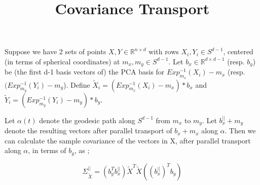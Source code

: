 \documentclass[]{article}
\title{Covariance Transport}
\begin{document}

%

Suppose we have 2 sets of points $X,Y \in \mathbb{R}^{n \times d}$ with rows $X_i, Y_i \in S^{d-1}$, centered (in terms of spherical coordinates) at $m_x, m_y \in S^{d-1}$. Let $b_x \in \mathbb{R}^{d \times d-1}$ (resp. $b_y$) be (the first d-1 basis vectors of) the PCA basis for $Exp_{m_x}^{-1}(X_i)-m_x$ (resp. $(Exp_{m_y}^{-1}(Y_i)-m_y$). Define $\tilde{X}_i = (Exp_{m_x}^{-1}(X_i)-m_x)*b_x$ and $\tilde{Y}_i = (Exp_{m_y}^{-1}(Y_i)-m_y)*b_y$.

Let $\alpha(t)$ denote the geodesic path along $S^{d-1}$ from $m_x$ to $m_y$. Let $b_{x}^{||} + m_y$ denote the resulting vectors after parallel transport of $b_{x} + m_x$ along $\alpha$. Then we can calculate the sample covariance of the vectors in X, after parallel transport along $\alpha$, in terms of $b_y$, as ;  




\begin{equation}
	\Sigma_{\tilde{X}}^{||} = ( b_y^T b_x^{||}) \tilde{X}^T \tilde{X} ((b_x^{||})^T b_y)
\end{equation}
\end{document}
